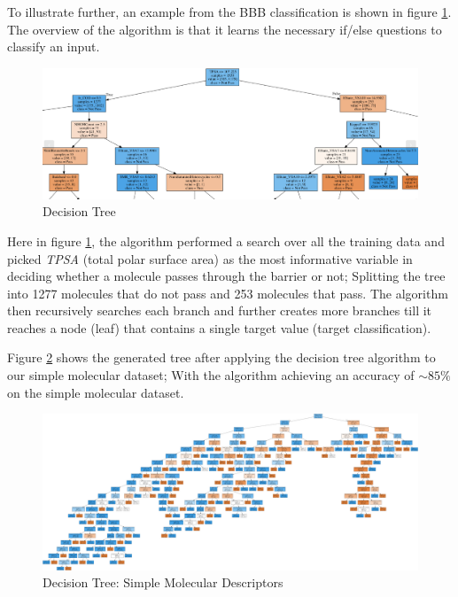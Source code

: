 \documentclass[a4paper,12pt]{report}
\begin{document}
			To illustrate further, an example from the BBB classification is shown in figure \ref{fig:bbb_tree_smd_detailed}. The overview of the algorithm is that it learns the necessary if/else questions to classify an input.
				\begin{figure}[H]
					\centering
					\includegraphics[width=\textwidth,scale=1,height=0.5\textheight]{images/bbb_tree_smd_larger}
					\caption{Decision Tree}
					\label{fig:bbb_tree_smd_detailed}
				\end{figure}
			Here in figure \ref{fig:bbb_tree_smd_detailed}, the algorithm performed a search over all the training data and picked \textit{TPSA} (total polar surface area) as the most informative variable in deciding whether a molecule passes through the barrier or not; Splitting the tree into 1277 molecules that do not pass and 253 molecules that pass. The algorithm then recursively searches each branch and further creates more branches till it reaches a node (leaf) that contains a single target value (target classification).
			
			Figure \ref{fig:bbb_tree_smd} shows the generated tree after applying the decision tree algorithm to our simple molecular dataset; With the algorithm achieving an accuracy of $\sim85\%$ on the simple molecular dataset.
				\begin{figure}[H]
					\centering
					\includegraphics[width=\textwidth,scale=1,totalheight=0.4\textheight]{images/bbb_tree_smd}
					\caption{Decision Tree: Simple Molecular Descriptors}
					\label{fig:bbb_tree_smd}
				\end{figure}		
			
\end{document}
